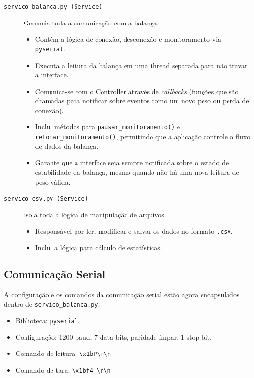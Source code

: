 \documentclass[12pt,a4paper]{article}
\begin{document}
\begin{description}
    \item[\texttt{servico\_balanca.py (Service)}] Gerencia toda a comunicação com a balança.
    \begin{itemize}
        \item Contém a lógica de conexão, desconexão e monitoramento via \texttt{pyserial}.
        \item Executa a leitura da balança em uma thread separada para não travar a interface.
        \item Comunica-se com o Controller através de \textit{callbacks} (funções que são chamadas para notificar sobre eventos como um novo peso ou perda de conexão).
        \item Inclui métodos para \texttt{pausar\_monitoramento()} e \texttt{retomar\_monitoramento()}, permitindo que a aplicação controle o fluxo de dados da balança.
        \item Garante que a interface seja sempre notificada sobre o estado de estabilidade da balança, mesmo quando não há uma nova leitura de peso válida.
    \end{itemize}

    \item[\texttt{servico\_csv.py (Service)}] Isola toda a lógica de manipulação de arquivos.
    \begin{itemize}
        \item Responsável por ler, modificar e salvar os dados no formato \texttt{.csv}.
        \item Inclui a lógica para cálculo de estatísticas.
    \end{itemize}
\end{description}

\subsection{Comunicação Serial}
A configuração e os comandos da comunicação serial estão agora encapsulados dentro de \texttt{servico\_balanca.py}.
\begin{itemize}
\item Biblioteca: \texttt{pyserial}.
\item Configuração: 1200 baud, 7 data bits, paridade ímpar, 1 stop bit.
\item Comando de leitura: \texttt{\textbackslash x1bP\textbackslash r\textbackslash n}
\item Comando de tara: \texttt{\textbackslash x1bf4\_\textbackslash r\textbackslash n}
\end{itemize}
\end{document}
